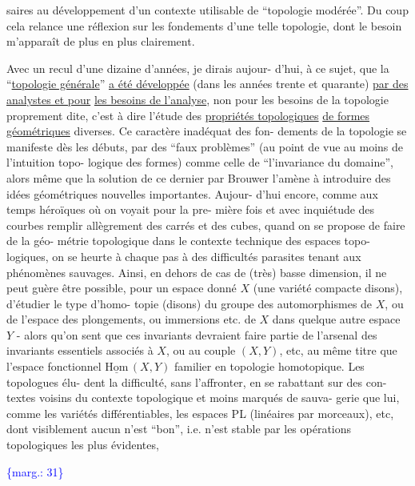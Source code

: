 \documentclass[11pt]{article}
\newcommand{\scanpage}[1]{\par\bigskip\noindent{\small\sffamily[scan #1]}\par}
\newcommand{\mspage}[1]{{\small\sffamily[p.\,#1]}}
\newcommand{\margin}[1]{\textcolor{blue}{\{\textsf{marg.:} #1\}}}
\newcommand{\uline}[1]{\underline{#1}}
\begin{document}
saires au développement d'un contexte utilisable de ``topologie
modérée''. Du coup cela relance une réflexion sur les fondements
d'une telle topologie, dont le besoin m'apparaît de plus en plus
clairement.

Avec un recul d'une dizaine d'années, je dirais aujour-%
d'hui, à ce sujet, que la ``\uline{topologie générale}'' \uline{a été développée}
(dans les années trente et quarante) \uline{par des analystes et pour}
\uline{les besoins de l'analyse}, non pour les besoins de la topologie
proprement dite, c'est à dire l'étude des \uline{propriétés topologiques}
\uline{de formes géométriques} diverses. Ce caractère inadéquat des fon-%
dements de la topologie se manifeste dès les débuts, par des
``faux problèmes'' (au point de vue au moins de l'intuition topo-%
logique des formes) comme celle de ``l'invariance du domaine'',
alors même que la solution de ce dernier par Brouwer l'amène à
introduire des idées géométriques nouvelles importantes. Aujour-%
d'hui encore, comme aux temps héroïques où on voyait pour la pre-%
mière fois et avec inquiétude des courbes remplir allègrement
des carrés et des cubes, quand on se propose de faire de la géo-%
métrie topologique dans le contexte technique des espaces topo-%
logiques, on se heurte à chaque pas à des difficultés parasites
tenant aux phénomènes sauvages. Ainsi, en dehors de cas de (très)
basse dimension, il ne peut guère être possible, pour un espace
donné $X$ (une variété compacte disons), d'étudier le type d'homo-%
topie (disons) du groupe des automorphismes de $X$, ou de l'espace
des plongements, ou immersions etc. de $X$ dans quelque autre
espace $Y$ - alors qu'on sent que ces invariants devraient faire
partie de l'arsenal des invariants essentiels associés à $X$, ou
au couple $(X,Y)$, etc, au même titre que l'espace fonctionnel
$\underline{\mathrm{Hom}}\,(X,Y)$ familier en topologie homotopique. Les topologues élu-%
dent la difficulté, sans l'affronter, en se rabattant sur des con-%
textes voisins du contexte topologique et moins marqués de sauva-%
gerie que lui, comme les variétés différentiables, les espaces PL
(linéaires par morceaux), etc, dont visiblement aucun n'est ``bon'',
i.e. n'est stable par les opérations topologiques les plus évidentes,

\margin{31}

\clearpage
\scanpage{119/32}
\mspage{30}
\end{document}
